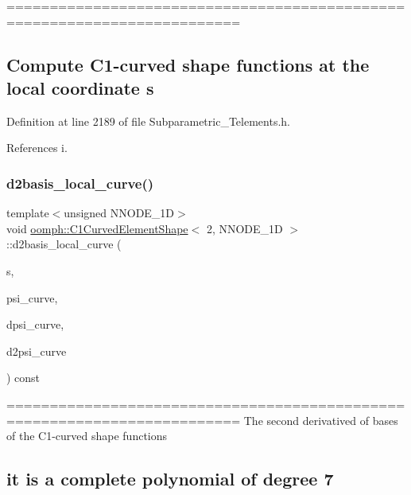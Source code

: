 ========================================================================= \subsection*{Compute C1-\/curved shape functions at the local coordinate s }

Definition at line 2189 of file Subparametric\+\_\+\+Telements.\+h.



References i.

\mbox{\label{classoomph_1_1C1CurvedElementShape_3_012_00_01NNODE__1D_01_4_a929507d3ddca39a6e27105b959853d84}} 
\subsubsection{\texorpdfstring{d2basis\+\_\+local\+\_\+curve()}{d2basis\_local\_curve()}}
{\footnotesize\ttfamily template$<$unsigned N\+N\+O\+D\+E\+\_\+1D$>$ \\
void \hyperlink{classoomph_1_1C1CurvedElementShape}{oomph\+::\+C1\+Curved\+Element\+Shape}$<$ 2, N\+N\+O\+D\+E\+\_\+1D $>$\+::d2basis\+\_\+local\+\_\+curve (\begin{DoxyParamCaption}\item[{const \hyperlink{classoomph_1_1Vector}{Vector}$<$ double $>$ \&}]{s,  }\item[{\hyperlink{classoomph_1_1Shape}{Shape} \&}]{psi\+\_\+curve,  }\item[{\hyperlink{classoomph_1_1DShape}{D\+Shape} \&}]{dpsi\+\_\+curve,  }\item[{\hyperlink{classoomph_1_1DShape}{D\+Shape} \&}]{d2psi\+\_\+curve }\end{DoxyParamCaption}) const\hspace{0.3cm}{\ttfamily [inline]}}

========================================================================= The second derivatived of bases of the C1-\/curved shape functions \subsection*{it is a complete polynomial of degree 7 }

